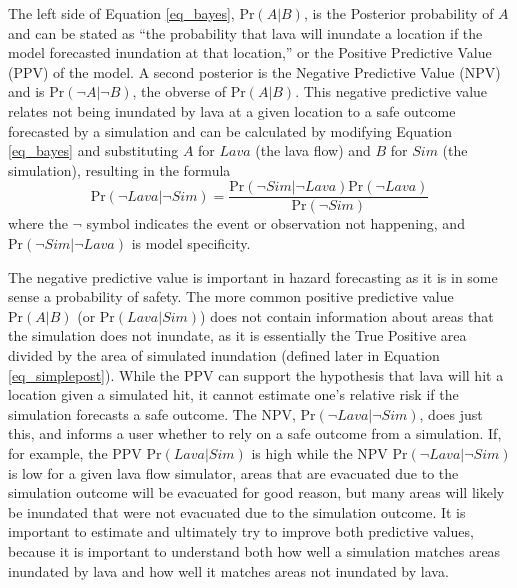 	The left side of Equation \ref{eq_bayes}, $\text{Pr}(A|B)$, is the Posterior probability of $A$ and can be stated as ``the probability that lava will inundate a location if the model forecasted inundation at that location,'' or the Positive Predictive Value (PPV) of the model. A second posterior is the Negative Predictive Value (NPV) and is $\text{Pr}(\neg A|\neg B)$, the obverse of $\text{Pr}(A|B)$. This negative predictive value relates not being inundated by lava at a given location to a safe outcome forecasted by a simulation and can be calculated by modifying Equation \ref{eq_bayes} and substituting $A$ for $Lava$ (the lava flow) and $B$ for $Sim$ (the simulation), resulting in the formula
	\begin{equation}
		\text{Pr}(\neg Lava|\neg Sim)=\frac{\text{Pr}(\neg Sim|\neg Lava)\text{Pr}(\neg Lava)}{\text{Pr}(\neg Sim)}
	\end{equation}
	where the $\neg$ symbol indicates the event or observation not happening, and $\text{Pr}(\neg Sim|\neg Lava)$ is model specificity.
	
	The negative predictive value is important in hazard forecasting as it is in some sense a probability of safety. The more common positive predictive value $\text{Pr}(A|B)$ (or $\text{Pr}(Lava|Sim)$) does not contain information about areas that the simulation does not inundate, as it is essentially the True Positive area divided by the area of simulated inundation (defined later in Equation \ref{eq_simplepost}). While the PPV can support the hypothesis that lava will hit a location given a simulated hit, it cannot estimate one's relative risk if the simulation forecasts a safe outcome. The NPV, $\text{Pr}(\neg Lava|\neg Sim)$, does just this, and informs a user whether to rely on a safe outcome from a simulation. If, for example, the PPV $\text{Pr}(Lava|Sim)$ is high while the NPV $\text{Pr}(\neg Lava|\neg Sim)$ is low for a given lava flow simulator, areas that are evacuated due to the simulation outcome will be evacuated for good reason, but many areas will likely be inundated that were not evacuated due to the simulation outcome. It is important to estimate and ultimately try to improve both predictive values, because it is important to understand both how well a simulation matches areas inundated by lava and how well it matches areas not inundated by lava.
	
